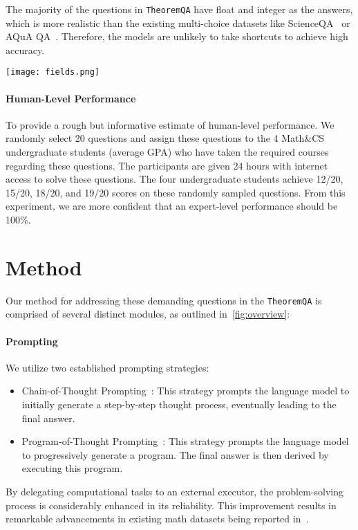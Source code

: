 \documentclass[11pt]{article}
\newcommand{\dataset}{\texttt{TheoremQA}\xspace}
\begin{document}
The majority of the questions in \dataset have float and integer as the answers, which is more realistic than the existing multi-choice datasets like ScienceQA~\cite{lu2022learn} or AQuA QA~\cite{ling2017program}. Therefore, the models are unlikely to take shortcuts to achieve high accuracy. 

\begin{figure*}
    \centering
    \texttt{[image: fields.png]}
    \caption{Subfields of \dataset under Math, Physics, Engineering, and Finance.}
    \label{fig:subfield}
\end{figure*}

\paragraph{Human-Level Performance}
To provide a rough but informative estimate of human-level performance. We randomly select 20 questions and assign these questions to the 4 Math\&CS undergraduate students (average GPA) who have taken the required courses regarding these questions. The participants are given 24 hours with internet access to solve these questions. The four undergraduate students achieve 12/20, 15/20, 18/20, and 19/20 scores on these randomly sampled questions. From this experiment, we are more confident that an expert-level performance should be 100\%.


\section{Method}
Our method for addressing these demanding questions in the \dataset is comprised of several distinct modules, as outlined in~\autoref{fig:overview}:

\paragraph{Prompting}
We utilize two established prompting strategies:
\begin{itemize}
\item Chain-of-Thought Prompting~\cite{weichain}: This strategy prompts the language model to initially generate a step-by-step thought process, eventually leading to the final answer.
\item Program-of-Thought Prompting~\cite{chen2022program,gao2022pal}: This strategy prompts the language model to progressively generate a program. The final answer is then derived by executing this program.
\end{itemize}
By delegating computational tasks to an external executor, the problem-solving process is considerably enhanced in its reliability. This improvement results in remarkable advancements in existing math datasets being reported in~\cite{chen2022program}.
\end{document}
